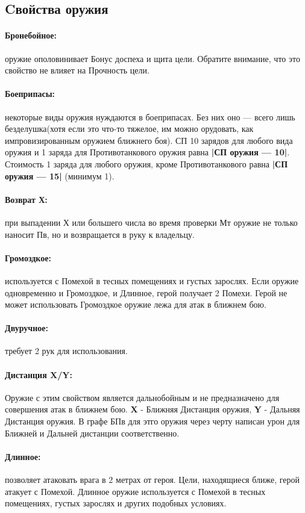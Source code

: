 \subsection{Cвойства оружия}
\paragraph{Бронебойное:} оружие ополовинивает Бонус доспеха и щита цели. Обратите внимание, что это свойство не влияет на Прочность цели.
\paragraph{Боеприпасы:} некоторые виды оружия нуждаются в боеприпасах. Без них оно  — всего лишь безделушка(хотя если это что-то тяжелое, им можно орудовать, как импровизированным оружием ближнего боя). СП 10 зарядов для любого вида оружия и 1 заряда для Противотанкового оружия равна \textbf{|СП оружия — 10|}. Стоимость 1 заряда для любого оружия, кроме Противотанкового равна \textbf{|СП оружия — 15|} (минимум 1).
\paragraph{Возврат Х:} при выпадении Х или большего числа во время проверки Мт оружие не только наносит Пв, но и возвращается в руку к владельцу.
\paragraph{Громоздкое:} используется с Помехой в тесных помещениях и густых зарослях. Если оружие одновременно и Громоздкое, и Длинное, герой получает 2 Помехи. Герой не может использовать Громоздкое оружие лежа для атак в ближнем бою.
\paragraph{Двуручное:} требует 2 рук для использования.
\paragraph{Дистанция X/Y:} Оружие с этим свойством является дальнобойным и не предназначено для совершения атак в ближнем бою. \textbf{X} - Ближняя Дистанция оружия, \textbf{Y} - Дальняя Дистанция оружия. В графе БПв для этго оружия через черту написан урон для Ближней и Дальней дистанции соответственно.
\paragraph{Длинное:} позволяет атаковать врага в 2 метрах от героя. Цели, находящиеся ближе, герой атакует с Помехой. Длинное оружие используется с Помехой в тесных помещениях, густых зарослях и других подобных условиях.
